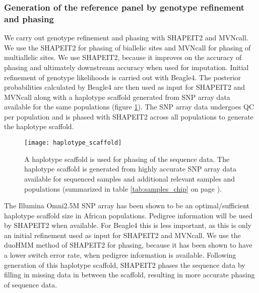 \subsubsection{Generation of the reference panel by genotype refinement and phasing}
\label{sec:refine_and_phase}
We carry out genotype refinement and phasing with SHAPEIT2\cite{Delaneau2012} and MVNcall.\cite{Menelaou2013} We use the SHAPEIT2 for phasing of biallelic sites and MVNcall for phasing of multiallelic sites. We use SHAPEIT2, because it improves on the accuracy of phasing\cite{2014Delaneau} and ultimately downstream accuracy when used for imputation\cite{2015Huang}. Initial refinement of genotype likelihoods is carried out with Beagle4.\cite{Browning20071084} The posterior probabilities calculated by Beagle4 are then used as input for SHAPEIT2 and MVNcall along with a haplotype scaffold generated from SNP array data available for the same populations (figure \ref{fig:haplotype_scaffold}). The SNP array data undergoes QC per population and is phased with SHAPEIT2 across all populations to generate the haplotype scaffold.

\begin{figure}[!htbp]
\centering
\texttt{[image: haplotype\_scaffold]}
\caption[Generation of haplotype scaffold from SNP array data for phasing of sequencing data.]{A haplotype scaffold is used for phasing of the sequence data. The haplotype scaffold is generated from highly accurate SNP array data available for sequenced samples and additional relevant samples and populations (summarized in table \ref{tab:samples_chip} on page \pageref{tab:samples_chip}).}
\label{fig:haplotype_scaffold}
\end{figure}

The Illumina Omni2.5M SNP array has been shown to be an optimal/sufficient haplotype scaffold size in African populations.\cite{Menelaou2013}\cite{2014Delaneau} Pedigree information will be used by SHAPEIT2 when available. For Beagle4 this is less important, as this is only an initial refinement used as input for SHAPEIT2 and MVNcall. We use the duoHMM method of SHAPEIT2 for phasing, because it has been shown to have a lower switch error rate, when pedigree information is available.\cite{OConnell2014} Following generation of this haplotype scaffold, SHAPEIT2 phases the sequence data by filling in missing data in between the scaffold, resulting in more accurate phasing of sequence data.

